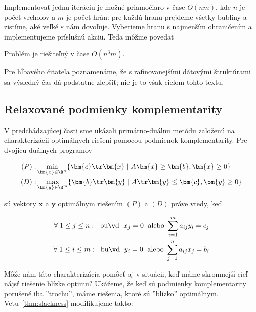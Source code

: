 \noindent
Implementovať jednu iteráciu je možné priamočiaro v čase $O(nm)$, kde $n$ je počet vrcholov a $m$ je počet hrán:
pre každú hranu prejdeme všetky bubliny a zistíme, aké veľké $\varepsilon$ nám dovoľuje. Vyberieme hranu
s najmenším ohraničením a implementujeme príslušnú akciu. Teda môžme povedať

\begin{veta}
  Problém \minfactor je riešiteľný v čase $O(n^3m)$.
\end{veta}

\noindent
Pre hĺbavého čitateľa poznamenáme, že s rafinovanejšími dátovými štruktúrami sa výsledný čas dá podstatne zlepšiť;
nie je to však cieľom tohto textu.



\subsection*{Relaxované podmienky komplementarity}


\noindent
V predchádzajúcej časti sme ukázali primárno-duálnu metódu založenú na charakterizácii
optimálnych riešení pomocou podmienok komplementarity. Pre dvojicu duálnych programov

\begin{eqnarray*}
  (P):&\min\limits_{\bm{x}\in\R^n}\{\bm{c}\tr\bm{x}\mid A\bm{x}\ge\bm{b}, \bm{x}\ge 0\}\\
  (D):&\max\limits_{\bm{y}\in\R^m}\{\bm{b}\tr\bm{y}\mid A\tr\bm{y}\le\bm{c}, \bm{y}\ge 0\}
\end{eqnarray*}

\noindent
sú vektory $\bm{x}$ a $\bm{y}$ optimálnym riešením $(P)$ a $(D)$ práve vtedy, keď

\begin{eqnarray*}
  \forall\;1\le j\le n:\;{\rm\ buď\ }\; x_j=0\; {\rm\ alebo\ }\sum_{i=1}^ma_{ij}y_i=c_j\\
  \forall\;1\le i\le m:\;{\rm\ buď\ }\; y_i=0\; {\rm\ alebo\ }\sum_{j=1}^na_{ij}x_j=b_i
\end{eqnarray*}

\noindent
Môže nám táto charakterizácia pomôcť aj v situácii, keď máme skromnejší cieľ nájsť riešenie
blízke optimu? Ukážeme, že keď sú podmienky komplementarity porušené iba ''trochu'',
máme riešenia, ktoré sú ''blízko'' optimálnym. Vetu~\ref{thm:slackness} modifikujeme takto:

